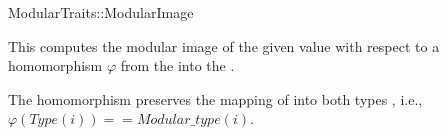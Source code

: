 \begin{ccRefFunctionObjectConcept}{ModularTraits::ModularImage}

\ccDefinition

This  computes the modular image of the given value 
with respect to a homomorphism $\varphi$ from the 
 into the .

The homomorphism preserves the mapping of  into both types
, i.e., $\varphi(Type(i)) == Modular\_type(i)$.


\ccTypes
{}


 
\ccRefines 
{} 

\end{ccRefFunctionObjectConcept}